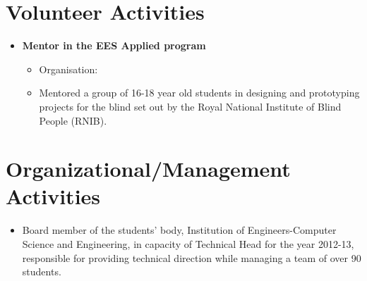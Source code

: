 \documentclass[10pt]{article}
\begin{document}
\section*{Volunteer Activities}
\begin{itemize}
	\item\bf{Mentor in the EES Applied program}
	\begin{itemize}
		\item[] Organisation: 
		\item[] Mentored a group of 16-18 year old students in designing and prototyping projects for the blind set out by the Royal National Institute of Blind People (RNIB).
	\end{itemize}
\end{itemize}

\section*{Organizational/Management Activities}
\begin{itemize}
	\item[] Board member of the students’ body, Institution of Engineers-Computer Science and Engineering, in capacity of Technical Head for the year 2012-13, responsible for providing technical direction while managing a team of over 90 students.
\end{itemize}
\end{document}
